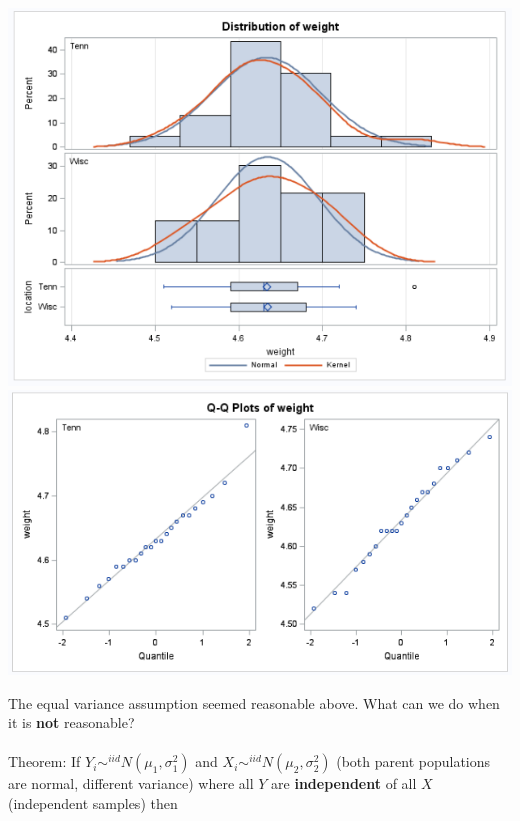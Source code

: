 \begin{center}
\includegraphics[scale=0.55	]{catfoodplot1}\includegraphics[scale=0.55]{catfoodplot2}
\end{center}

\newpage

The equal variance assumption seemed reasonable above.  What can we do when it is \textbf{not} reasonable?\\~\\

Theorem:  If $Y_i\sim^{iid}N(\mu_1,\sigma^2_1)$ and $X_i\sim^{iid}N(\mu_2,\sigma^2_2)$ (both parent populations are normal, different variance) where all $Y$ are \textbf{independent} of all $X$ (independent samples) then\\~\\~\\~\\~\\~\\~\\~\\~\\

